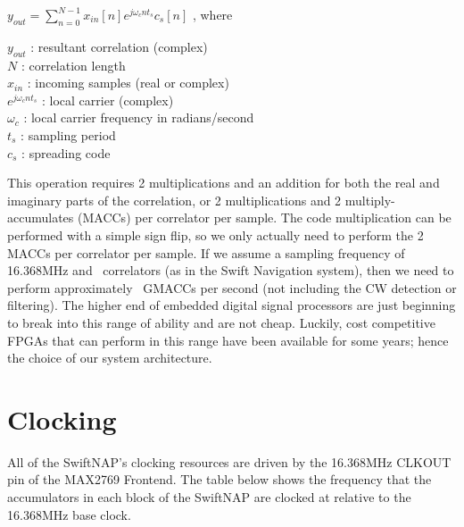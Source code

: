 \documentclass{article}
\begin{document}
\begin{multicols}{2}
\normalfont\footnotesize
\begin{center}$y_{out}=\displaystyle\sum\limits_{n=0}^{N-1}x_{in}[n]e^{j\omega_{c} nt_s}c_{s}[n]$ ,
where
\end{center}
$y_{out}$ : resultant correlation (complex)\\
$N$ : correlation length \\
$x_{in}$ : incoming samples (real or complex) \\
$e^{j\omega_{c} nt_s}$ : local carrier (complex)\\
$\omega_{c}$ : local carrier frequency in radians/second \\
$t_{s}$ : sampling period \\
$c_s$ : spreading code \\

\normalfont\normalsize

This operation requires 2 multiplications and an addition for both the real and imaginary parts of the correlation, or 2 multiplications and 2 multiply-accumulates (MACCs) per correlator per sample. The code multiplication can be performed with a simple sign flip, so we only actually need to perform the 2 MACCs per correlator per sample. If we assume a sampling frequency of 16.368MHz and \numcorrelators\ correlators (as in the Swift Navigation system), then we need to perform approximately \numgmaccs\ GMACCs per second (not including the CW detection or filtering). The higher end of embedded digital signal processors are just beginning to break into this range of ability and are not cheap. Luckily, cost competitive FPGAs that can perform in this range have been available for some years; hence the choice of our system architecture. 

\pagebreak

\section{Clocking}

All of the SwiftNAP's clocking resources are driven by the 16.368MHz CLKOUT pin of the MAX2769 Frontend. The table below shows the frequency that the accumulators in each block of the SwiftNAP are clocked at relative to the 16.368MHz base clock.
\begin{center}
\end{center}
\end{multicols}
\end{document}
